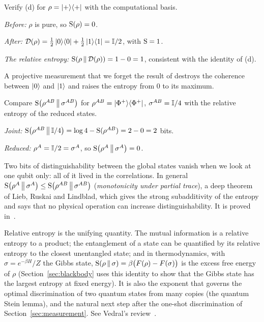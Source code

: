 \begin{example}\label{ex:entropy-increase}
  Verify (d) for $\rho=\left|+\right\rangle\!\left\langle+\right|$ with the computational basis.
\end{example}
\begin{solution}
  \begin{steps}
    \item \emph{Before:} $\rho$ is pure, so $\mathrm{S}(\rho)=0$.
    \item \emph{After:} $\mathcal D(\rho)=\tfrac12\left|0\right\rangle\!\left\langle0\right|+\tfrac12\left|1\right\rangle\!\left\langle1\right|=\mathbb{I}/2$, with $\mathrm{S}=1$.
    \item \emph{The relative entropy:} $\mathrm{S}\!\left(\rho\,\middle\|\,\mathcal D(\rho)\right)=1-0=1$, consistent with the identity of (d).
  \end{steps}
  A projective measurement that we forget the result of destroys the coherence between $\left|0\right\rangle$ and $\left|1\right\rangle$ and raises the entropy from $0$ to its maximum.
\end{solution}

\begin{example}\label{ex:monotone}
  Compare $\mathrm{S}\!\left(\rho^{AB}\,\middle\|\,\sigma^{AB}\right)$ for $\rho^{AB}=\left|\Phi^+\right\rangle\!\left\langle\Phi^+\right|$, $\sigma^{AB}=\mathbb{I}/4$ with the relative entropy of the reduced states.
\end{example}
\begin{solution}
  \begin{steps}
    \item \emph{Joint:} $\mathrm{S}\!\left(\rho^{AB}\,\middle\|\,\mathbb{I}/4\right)=\log4-\mathrm{S}(\rho^{AB})=2-0=2$ bits.
    \item \emph{Reduced:} $\rho^A=\mathbb{I}/2=\sigma^A$, so $\mathrm{S}\!\left(\rho^A\,\middle\|\,\sigma^A\right)=0$.
  \end{steps}
  Two bits of distinguishability between the global states vanish when we look at one qubit only: all of it lived in the correlations. In general $\mathrm{S}\!\left(\rho^A\,\middle\|\,\sigma^A\right)\le\mathrm{S}\!\left(\rho^{AB}\,\middle\|\,\sigma^{AB}\right)$ (\emph{monotonicity under partial trace}), a deep theorem of Lieb, Ruskai and Lindblad, which gives the strong subadditivity of the entropy and says that no physical operation can increase distinguishability. It is proved in~\cite{wilde2017}.
\end{solution}

\begin{lookahead}
  Relative entropy is the unifying quantity. The mutual information is a relative entropy to a product; the entanglement of a state can be quantified by its relative entropy to the closest unentangled state; and in thermodynamics, with $\sigma=e^{-\beta H}/Z$ the Gibbs state, $\mathrm{S}\!\left(\rho\,\middle\|\,\sigma\right)=\beta\bigl(F(\rho)-F(\sigma)\bigr)$ is the excess free energy of $\rho$ (Section~\ref{sec:blackbody} uses this identity to show that the Gibbs state has the largest entropy at fixed energy). It is also the exponent that governs the optimal discrimination of two quantum states from many copies (the quantum Stein lemma), and the natural next step after the one-shot discrimination of Section~\ref{sec:measurement}. See Vedral's review~\cite{vedral2002}.
\end{lookahead}

